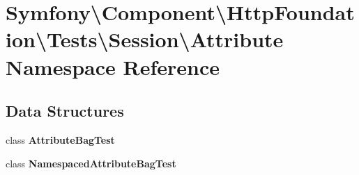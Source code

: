 \section{Symfony\textbackslash{}Component\textbackslash{}Http\+Foundation\textbackslash{}Tests\textbackslash{}Session\textbackslash{}Attribute Namespace Reference}
\label{namespace_symfony_1_1_component_1_1_http_foundation_1_1_tests_1_1_session_1_1_attribute}
\subsection*{Data Structures}
\begin{DoxyCompactItemize}
\item 
class {\bf Attribute\+Bag\+Test}
\item 
class {\bf Namespaced\+Attribute\+Bag\+Test}
\end{DoxyCompactItemize}
